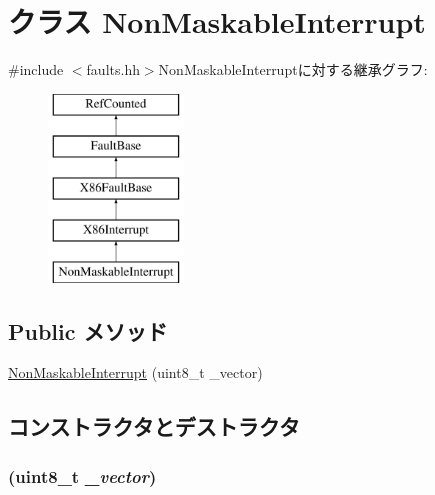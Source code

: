 \hypertarget{classX86ISA_1_1NonMaskableInterrupt}{
\section{クラス NonMaskableInterrupt}
\label{classX86ISA_1_1NonMaskableInterrupt}
}


{\ttfamily \#include $<$faults.hh$>$}NonMaskableInterruptに対する継承グラフ:\begin{figure}[H]
\begin{center}
\leavevmode
\includegraphics[height=5cm]{classX86ISA_1_1NonMaskableInterrupt}
\end{center}
\end{figure}
\subsection*{Public メソッド}
\begin{DoxyCompactItemize}
\item 
\hyperlink{classX86ISA_1_1NonMaskableInterrupt_a652fe9beb7f0d2418c4131c57232ce7c}{NonMaskableInterrupt} (uint8\_\-t \_\-vector)
\end{DoxyCompactItemize}


\subsection{コンストラクタとデストラクタ}
\hypertarget{classX86ISA_1_1NonMaskableInterrupt_a652fe9beb7f0d2418c4131c57232ce7c}{
\subsubsection[{NonMaskableInterrupt}]{ (uint8\_\-t {\em \_\-vector})}}
\label{classX86ISA_1_1NonMaskableInterrupt_a652fe9beb7f0d2418c4131c57232ce7c}



